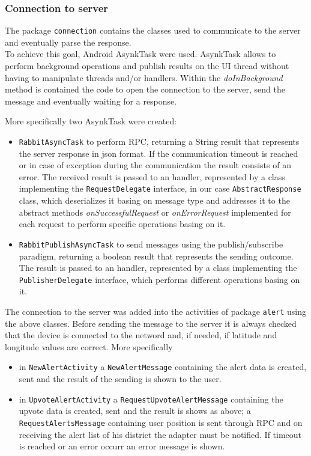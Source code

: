 \documentclass[a4paper,12pt]{report}
\begin{document}
\subsubsection{Connection to server}
The package \texttt{connection} contains the classes used to communicate to the server and eventually parse the response.
\\To achieve this goal, Android AsynkTask were used. AsynkTask allows to perform background operations and publish results on the UI thread without having to manipulate threads and/or handlers. Within the \textit{doInBackground} method is contained the code to open the connection to the server, send the message and eventually waiting for a response.

More specifically two AsynkTask were created:
\begin{itemize}
 \item \texttt{RabbitAsyncTask} to perform RPC, returning a String result that represents the server response in json format. If the communication timeout is reached or in case of exception during the communication the result consists of an error. The received result is passed to an handler, represented by a class implementing the \texttt{RequestDelegate} interface, in our case \texttt{AbstractResponse} class, which deserializes it basing on message type and addresses it to the abstract methods \textit{onSuccessfulRequest} or \textit{onErrorRequest} implemented for each request to perform specific operations basing on it.
 \item \texttt{RabbitPublishAsyncTask} to send messages using the publish/subscribe paradigm, returning a boolean result that represents the sending outcome. The result is passed to an handler, represented by a class implementing the \texttt{PublisherDelegate} interface, which performs different operations basing on it.
\end{itemize}
The connection to the server was added into the activities of package \texttt{alert} using the above classes. Before sending the message to the server it is always checked that the device is connected to the netword and, if needed, if latitude and longitude values are correct. More specifically
\begin{itemize}
 \item in \texttt{NewAlertActivity} a \texttt{NewAlertMessage} containing the alert data is created, sent and the result of the sending is shown to the user.
 \item in \texttt{UpvoteAlertActivity} a \texttt{RequestUpvoteAlertMessage} containing the upvote data is created, sent and the result is shows as above; a \texttt{RequestAlertsMessage} containing user position is sent through RPC and on receiving the alert list of his district the adapter must be notified. If timeout is reached or an error occurr an error message is shown. 
\end{itemize}
\end{document}
